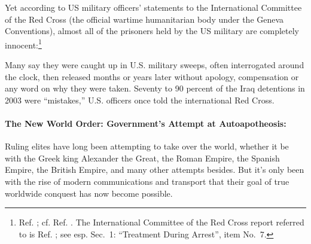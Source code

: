 \documentclass[letterpaper,12pt]{article}
\newenvironment{squote}
  {\small\quote}
  {\endquote\normalsize}
\begin{document}
Yet according to US military officers' statements to the International Committee of the Red Cross (the official wartime humanitarian body under the Geneva Conventions), almost all of the prisoners held by the US military are completely innocent:\footnote{Ref. ; cf. Ref. . The International Committee of the Red Cross report referred to is Ref. ; see esp. Sec.~1: ``Treatment During Arrest'', item No.~7.}

\begin{squote}
Many say they were caught up in U.S. military sweeps, often interrogated around the clock, then released months or years later without apology, compensation or any word on why they were taken. Seventy to 90 percent of the Iraq detentions in 2003 were ``mistakes,'' U.S. officers once told the international Red Cross.
\end{squote}

\paragraph{The New World Order: Government's Attempt at Autoapotheosis:}
\label{parag:NewWorldOrderGovernmentAttemptAutoapotheosis}

Ruling elites have long been attempting to take over the world, whether it be with the Greek king Alexander the Great, the Roman Empire, the Spanish Empire, the British Empire, and many other attempts besides. But it's only been with the rise of modern communications and transport that their goal of true worldwide conquest has now become possible.
\end{document}
